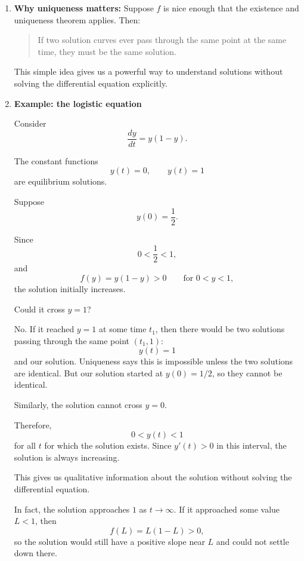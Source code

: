 \documentclass{article}
\begin{document}
\begin{enumerate}
\begin{enumerate}
	Thus the point $(0,0)$ lies on multiple solution curves of the differential equation, but strictly speaking these are not classical 	solutions of the IVP on an interval containing $t=0$, since the differential equation is undefined at the initial point.

	This illustrates why the hypotheses of the theorem matter: if $f$ is not defined at the initial point, we cannot use the theorem to 	guarantee existence or uniqueness.
\end{enumerate}

\item \textbf{Why uniqueness matters:} Suppose $f$ is nice enough that the existence and uniqueness theorem applies. Then:
\begin{quote}
If two solution curves ever pass through the same point at the same time, they must be the same solution.
\end{quote}
This simple idea gives us a powerful way to understand solutions without solving the differential equation explicitly.

\item \textbf{Example: the logistic equation}

Consider
\[
\frac{dy}{dt}=y(1-y).
\]

The constant functions
\[
y(t)=0,\qquad y(t)=1
\]
are equilibrium solutions.

Suppose
\[
y(0)=\frac12.
\]

Since
\[
0<\frac12<1,
\]
and
\[
f(y)=y(1-y)>0\qquad\text{for }0<y<1,
\]
the solution initially increases.

Could it cross $y=1$?

No. If it reached $y=1$ at some time $t_1$, then there would be two solutions passing through the same point $(t_1,1)$:
\[
y(t)=1
\]
and our solution. Uniqueness says this is impossible unless the two solutions are identical. But our solution started at $y(0)=1/2$, so they cannot be identical.

Similarly, the solution cannot cross $y=0$.

Therefore,
\[
0<y(t)<1
\]
for all $t$ for which the solution exists. Since $y'(t)>0$ in this interval, the solution is always increasing.

This gives us qualitative information about the solution without solving the differential equation.

In fact, the solution approaches $1$ as $t\to\infty$. If it approached some value $L<1$, then
\[
f(L)=L(1-L)>0,
\]
so the solution would still have a positive slope near $L$ and could not settle down there.



\end{enumerate}
\end{document}
